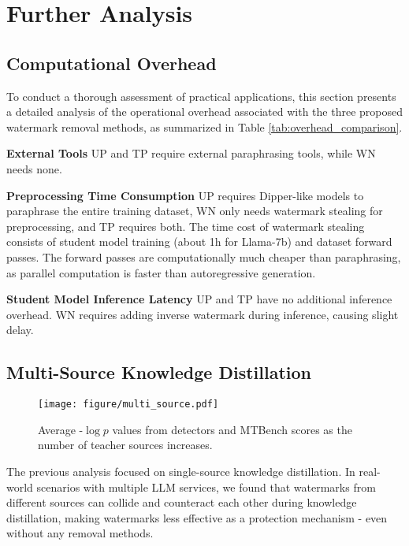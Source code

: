 \section{Further Analysis}
\subsection{Computational Overhead}
\label{sec:computational}
To conduct a thorough assessment of practical applications, this section presents a detailed analysis of the operational overhead associated with the three proposed watermark removal methods, as summarized in Table \ref{tab:overhead_comparison}.

\vspace{3pt}

\noindent\textbf{External Tools} \quad UP and TP require external paraphrasing tools, while WN needs none.

\vspace{3pt}

\noindent\textbf{Preprocessing Time Consumption} \quad UP requires Dipper-like models to paraphrase the entire training dataset, WN only needs watermark stealing for preprocessing, and TP requires both. The time cost of watermark stealing consists of student model training (about 1h for Llama-7b) and dataset forward passes. The forward passes are computationally much cheaper than paraphrasing, as parallel computation is faster than autoregressive generation.

\vspace{3pt}

\noindent\textbf{Student Model Inference Latency} \quad UP and TP have no additional inference overhead. WN requires adding inverse watermark during inference, causing slight delay. 


\subsection{Multi-Source Knowledge Distillation}

\begin{figure}[t]
    \centering
    \texttt{[image: figure/multi\_source.pdf]}
    \caption{Average -$\log p$ values from detectors and MTBench scores as the number of teacher sources increases.}
    \label{fig:multi_source}
    \vspace{-15pt}
\end{figure}
\label{sec:multi-source}
The previous analysis focused on single-source knowledge distillation. In real-world scenarios with multiple LLM services, we found that watermarks from different sources can collide and counteract each other during knowledge distillation, making watermarks less effective as a protection mechanism - even without any removal methods. 

